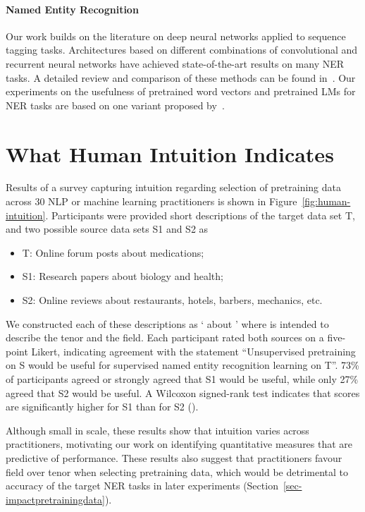 \documentclass[11pt,a4paper]{article}
\begin{document}
\paragraph{Named Entity Recognition}
Our work builds on the literature on deep neural networks applied to sequence tagging tasks.
Architectures based on different combinations of convolutional and recurrent neural networks have achieved state-of-the-art results on many NER tasks. 
A detailed review and comparison of these methods can be found in~\citep{Yang:Liang:COLING:2018}. 
Our experiments on the usefulness of pretrained word vectors and pretrained LMs for NER tasks are based on one variant proposed by~\citet{Lample:Ballesteros:NAACL:2016}.

\section{What Human Intuition Indicates}
\label{section:survey}
Results of a survey capturing intuition regarding selection of pretraining data across 30 NLP or machine learning practitioners is shown in Figure~\ref{fig:human-intuition}. Participants were provided short descriptions of the target data set T, and two possible source data sets S1 and S2 as
\begin{itemize}
    \item T: Online forum posts about medications;
    \item S1: Research papers about biology and health; 
    \item S2: Online reviews about restaurants, hotels, barbers, mechanics, etc.
\end{itemize}

We constructed each of these descriptions as ` about ' where  is intended to describe the tenor and  the field. Each participant rated both sources on a five-point Likert, indicating agreement with the statement ``Unsupervised pretraining on S would be useful for supervised named entity recognition learning on T''.  73\% of participants agreed or strongly agreed that S1 would be useful, while only 27\% agreed that S2 would be useful. A Wilcoxon signed-rank test indicates that scores are significantly higher for S1 than for S2 (). 

Although small in scale, these results show that intuition varies across practitioners, motivating our work on identifying quantitative measures that are predictive of performance. These results also suggest that practitioners favour field over tenor when selecting pretraining data, which would be detrimental to accuracy of the target NER tasks in later experiments (Section~\ref{sec-impactpretrainingdata}).
\end{document}

